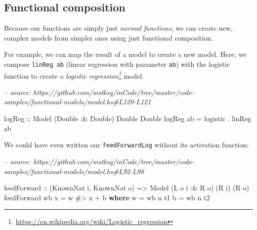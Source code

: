 \documentclass[]{article}
\newenvironment{Shaded}{}{}
\newcommand{\CommentTok}[1]{\textcolor[rgb]{0.38,0.63,0.69}{\textit{#1}}}
\newcommand{\DataTypeTok}[1]{\textcolor[rgb]{0.56,0.13,0.00}{#1}}
\newcommand{\FunctionTok}[1]{\textcolor[rgb]{0.02,0.16,0.49}{#1}}
\newcommand{\KeywordTok}[1]{\textcolor[rgb]{0.00,0.44,0.13}{\textbf{#1}}}
\newcommand{\NormalTok}[1]{#1}
\newcommand{\OtherTok}[1]{\textcolor[rgb]{0.00,0.44,0.13}{#1}}
\renewcommand{\href}[2]{#2\footnote{\url{#1}}}
\begin{document}
\hypertarget{functional-composition}{%
\subsection{Functional composition}\label{functional-composition}}

Because our functions are simply just \emph{normal functions}, we can create
new, complex models from simpler ones using just functional composition.

For example, we can map the result of a model to create a new model. Here, we
compose \texttt{linReg\ ab} (linear regression with parameter \texttt{ab}) with
the logistic function to create a
\emph{\href{https://en.wikipedia.org/wiki/Logistic_regression}{logistic
regression}} model.

\begin{Shaded}
\begin{Highlighting}[]
\CommentTok{-- source: https://github.com/mstksg/inCode/tree/master/code-samples/functional-models/model.hs#L120-L121}

\OtherTok{logReg ::} \DataTypeTok{Model}\NormalTok{ (}\DataTypeTok{Double} \FunctionTok{:&} \DataTypeTok{Double}\NormalTok{) }\DataTypeTok{Double} \DataTypeTok{Double}
\NormalTok{logReg ab }\FunctionTok{=}\NormalTok{ logistic }\FunctionTok{.}\NormalTok{ linReg ab}
\end{Highlighting}
\end{Shaded}

We could have even written our \texttt{feedForwardLog} without its activation
function:

\begin{Shaded}
\begin{Highlighting}[]
\CommentTok{-- source: https://github.com/mstksg/inCode/tree/master/code-samples/functional-models/model.hs#L92-L98}

\NormalTok{feedForward}
\OtherTok{    ::}\NormalTok{ (}\DataTypeTok{KnownNat}\NormalTok{ i, }\DataTypeTok{KnownNat}\NormalTok{ o)}
    \OtherTok{=>} \DataTypeTok{Model}\NormalTok{ (}\DataTypeTok{L}\NormalTok{ o i }\FunctionTok{:&} \DataTypeTok{R}\NormalTok{ o) (}\DataTypeTok{R}\NormalTok{ i) (}\DataTypeTok{R}\NormalTok{ o)}
\NormalTok{feedForward wb x }\FunctionTok{=}\NormalTok{ w }\FunctionTok{#>}\NormalTok{ x }\FunctionTok{+}\NormalTok{ b}
  \KeywordTok{where}
\NormalTok{    w }\FunctionTok{=}\NormalTok{ wb }\FunctionTok{^^.}\NormalTok{ t1}
\NormalTok{    b }\FunctionTok{=}\NormalTok{ wb }\FunctionTok{^^.}\NormalTok{ t2}
\end{Highlighting}
\end{Shaded}
\end{document}
